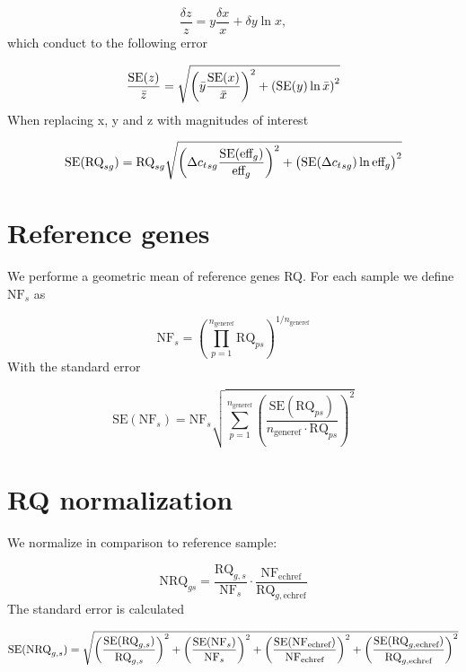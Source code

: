 \documentclass[a4paper,10pt]{article}
\begin{document}
\begin{equation}
 \dfrac{\delta z}{z} = y\dfrac{\delta x}{x}+\delta y \ln x,
\end{equation}
which conduct to the following error

\begin{equation}
 \dfrac{\text{SE}(z)}{\bar{z}} =\sqrt{%
\left(\bar{y}\dfrac{\text{SE}(x)}{\bar{x}}\right)^2+\left(\text{SE}(y) \ln
\bar{x}\right)^2}
\end{equation}
When replacing x, y and z with magnitudes of interest

\begin{equation}
 \text{SE}(\text{RQ}_{sg}) =\text{RQ}_{sg}\sqrt{%
 \left({\Delta c_t}_{sg}\dfrac{\text{SE}(\text{eff}_g)}{\text{eff}_g}\right)^2+
 \left(\text{SE}({\Delta c_t}_{sg}) \ln \text{eff}_g\right)^2}
\end{equation}

\section{Reference genes}

We performe a geometric mean of reference genes RQ. For each sample we define $\text{NF}_{s}$ as

\begin{equation}
 \text{NF}_s = \left( \prod_{p=1}^{n_{\text{generef}}} \text{RQ}_{ps}
\right)^{1/n_{\text{generef}}}
\end{equation}
With the standard error

\begin{equation} 
\text{SE}(\text{NF}_s) = \text{NF}_s  \sqrt{\sum_{p=1}^{n_{\text{generef}}}
\left( \dfrac{\text{SE}(\text{RQ}_{ps})}{n_{\text{generef}}\cdot 
\text{RQ}_{ps}} \right)^2}
\end{equation}

\section{RQ normalization}

We normalize in comparison to reference sample:

\begin{equation}
 \text{NRQ}_{gs} =
\dfrac{\text{RQ}_{g,s}}{\text{NF}_s}
\cdot \dfrac{\text{NF}_{\text{echref}}} {\text{RQ}_{g,\text{echref}}}
\end{equation}
The standard error is calculated

\begin{equation}
 \text{SE}(\text{NRQ}_{g,s}) = \sqrt{%
\left(\dfrac{\text{SE}(\text{RQ}_{g,s})}{\text{RQ}_{g,s}} \right)^2 +
\left(\dfrac{\text{SE}(\text{NF}_{s})}{\text{NF}_{s}} \right)^2 +
\left(\dfrac{\text{SE}(\text{NF}_{\text{echref}})}{\text{NF}_{\text{echref}}}
\right)^2 +
\left(\dfrac{\text{SE}(\text{RQ}_{g,\text{echref}})}{\text{RQ}_{g,\text{echref}}
} \right)^2
}
\end{equation}
\end{document}
